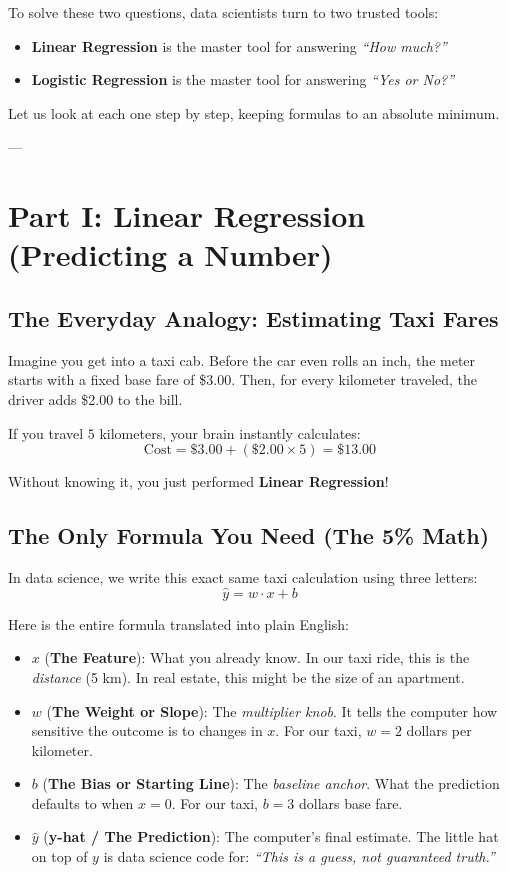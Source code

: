 \documentclass[11pt,journal,onecolumn]{IEEEtran}
\begin{document}
To solve these two questions, data scientists turn to two trusted tools:
\begin{itemize}
    \item \textbf{Linear Regression} is the master tool for answering \textit{``How much?''}
    \item \textbf{Logistic Regression} is the master tool for answering \textit{``Yes or No?''}
\end{itemize}

Let us look at each one step by step, keeping formulas to an absolute minimum.

---

\section{Part I: Linear Regression (Predicting a Number)}

\subsection{The Everyday Analogy: Estimating Taxi Fares}
Imagine you get into a taxi cab. Before the car even rolls an inch, the meter starts with a fixed base fare of \$3.00. Then, for every kilometer traveled, the driver adds \$2.00 to the bill.

If you travel $5$ kilometers, your brain instantly calculates:
$$\text{Cost} = \$3.00 + (\$2.00 \times 5) = \$13.00$$

Without knowing it, you just performed \textbf{Linear Regression}!

\subsection{The Only Formula You Need (The 5\% Math)}
In data science, we write this exact same taxi calculation using three letters:
\begin{equation}
\hat{y} = w \cdot x + b
\end{equation}

Here is the entire formula translated into plain English:
\begin{itemize}
    \item $x$ (\textbf{The Feature}): What you already know. In our taxi ride, this is the \textit{distance} (5 km). In real estate, this might be the size of an apartment.
    \item $w$ (\textbf{The Weight or Slope}): The \textit{multiplier knob}. It tells the computer how sensitive the outcome is to changes in $x$. For our taxi, $w = 2$ dollars per kilometer.
    \item $b$ (\textbf{The Bias or Starting Line}): The \textit{baseline anchor}. What the prediction defaults to when $x = 0$. For our taxi, $b = 3$ dollars base fare.
    \item $\hat{y}$ (\textbf{y-hat / The Prediction}): The computer's final estimate. The little hat on top of $y$ is data science code for: \textit{``This is a guess, not guaranteed truth.''}
\end{itemize}
\end{document}
